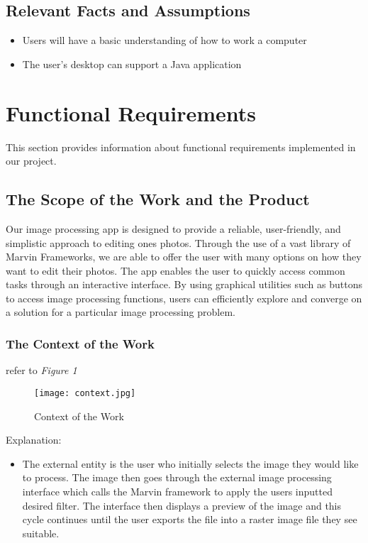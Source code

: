 \documentclass[12pt, titlepage]{article}
\begin{document}
\subsection{Relevant Facts and Assumptions}

\begin{itemize}
  \item Users will have a basic understanding of how to work a computer
  \item The user's desktop can support a Java application
\end{itemize}

\section{Functional Requirements}

This section provides information about functional requirements implemented in our project.
\subsection{The Scope of the Work and the Product}

Our image processing app is designed to provide a reliable, user-friendly, and simplistic approach to editing ones photos. Through the use of a vast library of Marvin Frameworks, we are able to offer the user with many options on how they want to edit their photos. The app enables the user to quickly access common tasks through an interactive interface. By using graphical utilities such as buttons to access image processing functions, users can efficiently explore and converge on a solution for a particular image processing problem.

\clearpage

\subsubsection{The Context of the Work}

refer to \textit{Figure 1}

\begin{figure}[h]
	\texttt{[image: context.jpg]}
	\caption{Context of the Work}
	\end{figure}
	
Explanation:

\begin{itemize}
	\item The external entity is the user who initially selects the image they would like to process. The image then goes through the external image processing interface which calls the Marvin framework to apply the users inputted desired filter. The interface then displays a preview of the image and this cycle continues until the user exports the file into a raster image file they see suitable.
\end{itemize}
\end{document}
